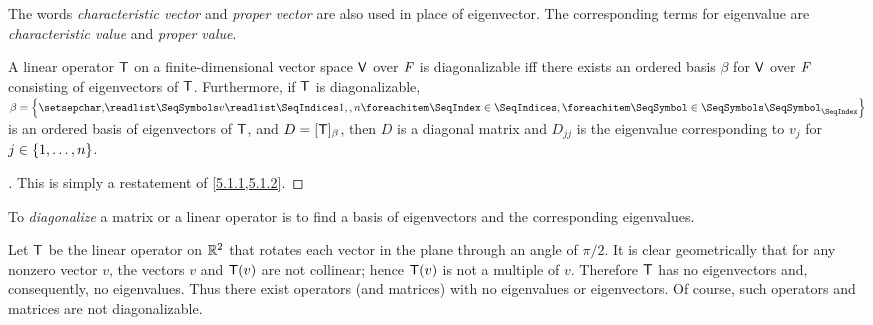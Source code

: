\begin{note}
  The words \emph{characteristic vector} and \emph{proper vector} are also used in place of eigenvector.
  The corresponding terms for eigenvalue are \emph{characteristic value} and \emph{proper value}.
\end{note}

\begin{thm}\label{5.1}
  A linear operator \(\mathsf{T}\) on a finite-dimensional vector space \(\mathsf{V}\) over \(\mathit{F}\) is diagonalizable iff there exists an ordered basis \(\beta\) for \(\mathsf{V}\) over \(\mathit{F}\) consisting of eigenvectors of \(\mathsf{T}\).
  Furthermore, if \(\mathsf{T}\) is diagonalizable, \(\beta = \set{\seq{v}{1,,n}}\) is an ordered basis of eigenvectors of \(\mathsf{T}\), and \(D = [\mathsf{T}]_{\beta}\), then \(D\) is a diagonal matrix and \(D_{j j}\) is the eigenvalue corresponding to \(v_j\) for \(j \in \left\lbrace1, \dots, n\right\rbrace\).
\end{thm}

\begin{proof}[]
  This is simply a restatement of \cref{5.1.1,5.1.2}.
\end{proof}

\begin{note}
  To \emph{diagonalize} a matrix or a linear operator is to find a basis of eigenvectors and the corresponding eigenvalues.
\end{note}

\begin{eg}\label{5.1.3}
  Let \(\mathsf{T}\) be the linear operator on \(\mathbb{R}^2\) that rotates each vector in the plane through an angle of \(\pi / 2\).
  It is clear geometrically that for any nonzero vector \(v\), the vectors \(v\) and \(\mathsf{T}(v)\) are not collinear;
  hence \(\mathsf{T}(v)\) is not a multiple of \(v\).
  Therefore \(\mathsf{T}\) has no eigenvectors and, consequently, no eigenvalues.
  Thus there exist operators (and matrices) with no eigenvalues or eigenvectors.
  Of course, such operators and matrices are not diagonalizable.
\end{eg}

